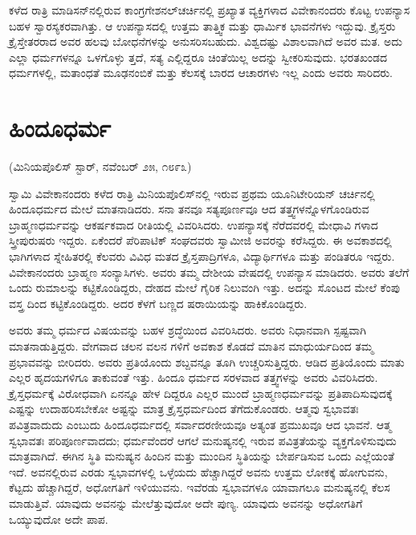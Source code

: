 ಕಳೆದ ರಾತ್ರಿ ಮಾಡಿಸನ್​ನಲ್ಲಿರುವ ಕಾಂಗ್ರಗೇಶನಲ್​ಚರ್ಚಿನಲ್ಲಿ ಪ್ರಖ್ಯಾತ ವ್ಯಕ್ತಿಗಳಾದ ವಿವೇಕಾನಂದರು ಕೊಟ್ಟ ಉಪನ್ಯಾಸ ಬಹಳ ಸ್ವಾರಸ್ಯಕರವಾಗಿತ್ತು. ಆ ಉಪನ್ಯಾಸದಲ್ಲಿ ಉತ್ತಮ ತಾತ್ತ್ವಿಕ ಮತ್ತು ಧಾರ್ಮಿಕ ಭಾವನೆಗಳು ಇದ್ದುವು. ಕ್ರೈಸ್ತರು ಕ್ರೈಸ್ತೇತರರಾದ ಅವರ ಹಲವು ಬೋಧನೆಗಳನ್ನು ಅನುಸರಿಸಬಹುದು. ವಿಶ್ವದಷ್ಟು ವಿಶಾಲವಾಗಿದೆ ಅವರ ಮತ. ಅದು ಎಲ್ಲಾ ಧರ್ಮಗಳನ್ನೂ ಒಳಗೊಳ್ಳು ತ್ತದೆ, ಸತ್ಯ ಎಲ್ಲಿದ್ದರೂ ಚಿಂತೆಯಿಲ್ಲ ಅದನ್ನು ಸ್ವೀಕರಿಸುವುದು. ಭರತಖಂಡದ ಧರ್ಮಗಳಲ್ಲಿ, ಮತಾಂಧತೆ ಮೂಢನಂಬಿಕೆ ಮತ್ತು ಕೆಲಸಕ್ಕೆ ಬಾರದ ಆಚಾರಗಳು ಇಲ್ಲ ಎಂದು ಅವರು ಸಾರಿದರು.

\delimiter


\section{ಹಿಂದೂಧರ್ಮ}

\begin{center}
(ಮಿನಿಯಪೊಲಿಸ್​ ಸ್ಟಾರ್​, ನವೆಂಬರ್​ ೨೫, ೧೮೯೩)
\end{center}

ಸ್ವಾಮಿ ವಿವೇಕಾನಂದರು ಕಳೆದ ರಾತ್ರಿ ಮಿನಿಯಪೊಲಿಸ್​ನಲ್ಲಿ ಇರುವ ಪ್ರಥಮ ಯೂನಿಟೇರಿಯನ್​ ಚರ್ಚಿನಲ್ಲಿ ಹಿಂದೂಧರ್ಮದ ಮೇಲೆ ಮಾತನಾಡಿದರು. ಸನಾ ತನವೂ ಸತ್ಯಪೂರ್ಣವೂ ಆದ ತತ್ತ್ವಗಳನ್ನೊಳಗೊಂಡಿರುವ ಬ್ರಾಹ್ಮಣಧರ್ಮವನ್ನು ಆಕರ್ಷಕವಾದ ರೀತಿಯಲ್ಲಿ ವಿವರಿಸಿದರು. ಉಪನ್ಯಾಸಕ್ಕೆ ನೆರೆದವರಲ್ಲಿ ಮೇಧಾವಿ ಗಳಾದ ಸ್ತ್ರೀಪುರುಷರು ಇದ್ದರು. ಏಕೆಂದರೆ ಪೆರಿಪಾಟಿಕ್​ ಸಂಘದವರು ಸ್ವಾಮೀಜಿ ಅವರನ್ನು ಕರೆಸಿದ್ದರು. ಈ ಅವಕಾಶದಲ್ಲಿ ಭಾಗಿಗಳಾದ ಸ್ನೇಹಿತರಲ್ಲಿ ಕೆಲವರು ವಿವಿಧ ಮತದ ಕ್ರೈಸ್ತಪಾದ್ರಿಗಳೂ, ವಿದ್ಯಾರ್ಥಿಗಳೂ ಮತ್ತು ಪಂಡಿತರೂ ಇದ್ದರು. ವಿವೇಕಾನಂದರು ಬ್ರಾಹ್ಮಣ ಸಂನ್ಯಾಸಿಗಳು. ಅವರು ತಮ್ಮ ದೇಶೀಯ ವೇಷದಲ್ಲಿ ಉಪನ್ಯಾಸ ಮಾಡಿದರು. ಅವರು ತಲೆಗೆ ಒಂದು ರುಮಾಲನ್ನು ಕಟ್ಟಿಕೊಂಡಿದ್ದರು, ದೇಹದ ಮೇಲೆ ಗೈರಿಕ ನಿಲುವಂಗಿ ಇತ್ತು. ಅದನ್ನು ಸೊಂಟದ ಮೇಲೆ ಕೆಂಪು ವಸ್ತ್ರ ದಿಂದ ಕಟ್ಟಿಕೊಂಡಿದ್ದರು. ಅದರ ಕೆಳಗೆ ಬಣ್ಣದ ಷರಾಯಿಯನ್ನು ಹಾಕಿಕೊಂಡಿದ್ದರು.

ಅವರು ತಮ್ಮ ಧರ್ಮದ ವಿಷಯವನ್ನು ಬಹಳ ಶ್ರದ್ಧೆಯಿಂದ ವಿವರಿಸಿದರು. ಅವರು ನಿಧಾನವಾಗಿ ಸ್ಪಷ್ಟವಾಗಿ ಮಾತನಾಡುತ್ತಿದ್ದರು. ವೇಗವಾದ ಚಲನ ವಲನ ಗಳಿಗೆ ಅವಕಾಶ ಕೊಡದೆ ಮಾತಿನ ಮಾಧುರ್ಯದಿಂದ ತಮ್ಮ ಪ್ರಭಾವವನ್ನು ಬೀರಿದರು. ಅವರು ಪ್ರತಿಯೊಂದು ಶಬ್ದವನ್ನೂ ತೂಗಿ ಉಚ್ಚರಿಸುತ್ತಿದ್ದರು. ಆಡಿದ ಪ್ರತಿಯೊಂದು ಮಾತು ಎಲ್ಲರ ಹೃದಯಗಳಿಗೂ ತಾಕುವಂತೆ ಇತ್ತು. ಹಿಂದೂ ಧರ್ಮದ ಸರಳವಾದ ತತ್ತ್ವಗಳನ್ನು ಅವರು ವಿವರಿಸಿದರು. ಕ್ರೈಸ್ತಧರ್ಮಕ್ಕೆ ವಿರೋಧವಾಗಿ ಏನನ್ನೂ ಹೇಳ ದಿದ್ದರೂ ಎಲ್ಲರ ಮುಂದೆ ಬ್ರಾಹ್ಮಣಧರ್ಮವನ್ನು ಪ್ರತಿಪಾದಿಸುವುದಕ್ಕೆ ಎಷ್ಟನ್ನು ಉದಾಹರಿಸಬೇಕೋ ಅಷ್ಟನ್ನು ಮಾತ್ರ ಕ್ರೈಸ್ತಧರ್ಮದಿಂದ ತೆಗೆದುಕೊಂಡರು. ಆತ್ಮವು ಸ್ವಭಾವತಃ ಪವಿತ್ರವಾದುದು ಎಂಬುದು ಹಿಂದೂಧರ್ಮದಲ್ಲಿ ಸರ್ವಾದರಣೀಯವೂ ಅತ್ಯಂತ ಪ್ರಮುಖವೂ ಆದ ಭಾವನೆ. ಆತ್ಮ ಸ್ವಭಾವತಃ ಪರಿಪೂರ್ಣವಾದದು; ಧರ್ಮವೆಂದರೆ ಆಗಲೆ ಮನುಷ್ಯನಲ್ಲಿ ಇರುವ ಪವಿತ್ರತೆಯನ್ನು ವ್ಯಕ್ತಗೊಳಿಸುವುದು ಮಾತ್ರವಾಗಿದೆ. ಈಗಿನ ಸ್ಥಿತಿ ಮನುಷ್ಯನ ಹಿಂದಿನ ಮತ್ತು ಮುಂದಿನ ಸ್ಥಿತಿಯನ್ನು ಬೇರ್ಪಡಿಸುವ ಒಂದು ಎಲ್ಲೆಯಂತೆ ಇದೆ. ಅವನಲ್ಲಿರುವ ಎರಡು ಸ್ವಭಾವಗಳಲ್ಲಿ ಒಳ್ಳೆಯದು ಹೆಚ್ಚಾಗಿದ್ದರೆ ಅವನು ಉತ್ತಮ ಲೋಕಕ್ಕೆ ಹೋಗುವನು, ಕೆಟ್ಟದು ಹೆಚ್ಚಾಗಿದ್ದರೆ, ಅಧೋಗತಿಗೆ ಇಳಿಯುವನು. ಇವೆರಡು ಸ್ವಭಾವಗಳೂ ಯಾವಾಗಲೂ ಮನುಷ್ಯನಲ್ಲಿ ಕೆಲಸ ಮಾಡುತ್ತಿವೆ. ಯಾವುದು ಅವನನ್ನು ಮೇಲೆತ್ತುವುದೋ ಅದೇ ಪುಣ್ಯ. ಯಾವುದು ಅವನನ್ನು ಅಧೋಗತಿಗೆ ಒಯ್ಯುವುದೋ ಅದೇ ಪಾಪ.

